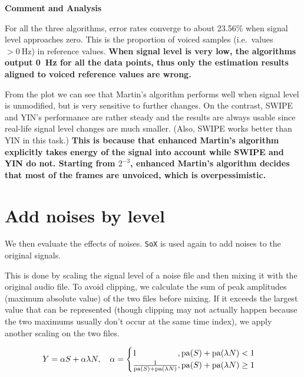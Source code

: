 \documentclass[11pt,a4paper]{report}
\begin{document}
\begin{mdframed}
\textbf{Comment and Analysis}

\bigskip

For all the three algorithms, error rates converge to about 23.56\% when signal level approaches zero.
This is the proportion of voiced samples (i.e.\ values \( > \SI{0}{\hertz} \)) in reference values.
\textbf{When signal level is very low, the algorithms output \SI{0}{\hertz} for all the data points, thus only the estimation results aligned to voiced reference values are wrong.}

\bigskip

From the plot we can see that Martin's algorithm performs well when signal level is unmodified, but is very sensitive to further changes.
On the contrast, SWIPE and YIN's performance are rather steady and the results are always usable since real-life signal level changes are much smaller.
(Also, SWIPE works better than YIN in this task.) \textbf{This is because that enhanced Martin's algorithm explicitly takes energy of the signal into account while SWIPE and YIN do not.
Starting from \(2^{-3}\), enhanced Martin's algorithm decides that most of the frames are unvoiced, which is overpessimistic.}
\end{mdframed}

\newpage

\section{Add noises by level}

We then evaluate the effects of noises.
\texttt{SoX} is used again to add noises to the original signals.

This is done by scaling the signal level of a noise file and then mixing it with the original audio file.
To avoid clipping, we calculate the sum of peak amplitudes (maximum absolute value) of the two files before mixing.
If it exceeds the largest value that can be represented (though clipping may not actually happen because the two maximums usually don't occur at the same time index), we apply another scaling on the two files.

\begin{equation}
  Y = \alpha S + \alpha \lambda N, \quad
  \alpha = \begin{cases}
    \mathrlap{1}\hphantom{\frac{1}{\mathrm{pa}(S) + \mathrm{pa}(\lambda N)}}, \mathrm{pa}(S) + \mathrm{pa}(\lambda N) < 1 \\
    \frac{1}{\mathrm{pa}(S) + \mathrm{pa}(\lambda N)}, \mathrm{pa}(S) + \mathrm{pa}(\lambda N) \geq 1
  \end{cases}
\end{equation}
\end{document}

